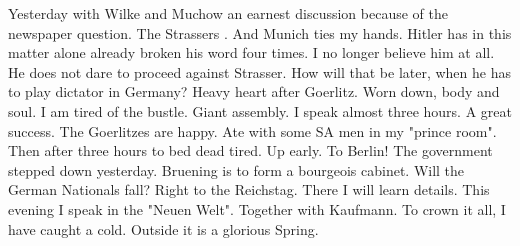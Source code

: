 Yesterday with Wilke and Muchow an earnest discussion because of the newspaper question. The Strassers . And Munich ties my hands. Hitler has in this matter alone already broken his word four times. I no longer believe him at all. He does not dare to proceed against Strasser. How will that be later, when he has to play dictator in Germany? Heavy heart after Goerlitz. Worn down, body and soul. I am tired of the bustle. Giant assembly. I speak almost three hours. A great success. The Goerlitzes are happy. Ate with some SA men in my "prince room". Then after three hours to bed dead tired. Up early. To Berlin! The government stepped down yesterday. Bruening is to form a bourgeois cabinet. Will the German Nationals fall? Right to the Reichstag. There I will learn details. This evening I speak in the "Neuen Welt". Together with Kaufmann. To crown it all, I have caught a cold. Outside it is a glorious Spring.